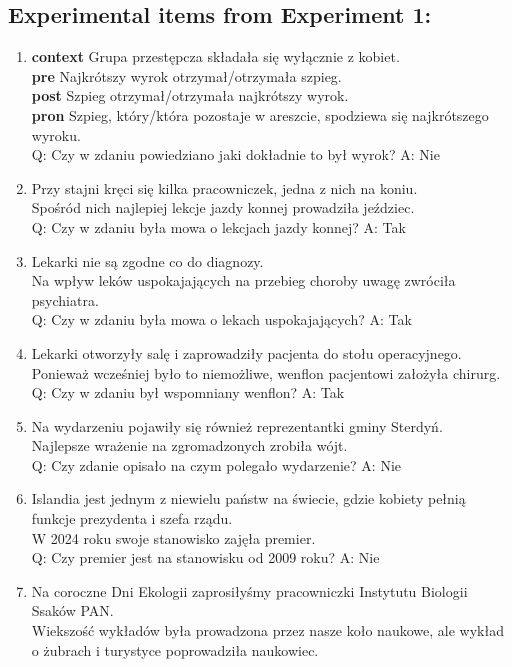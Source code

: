 \subsection*{Experimental items from Experiment 1:}
\begin{enumerate}
\item \textbf{context} Grupa przestępcza składała się wyłącznie z kobiet.\\
  \textbf{pre} Najkrótszy wyrok otrzymał/otrzymała szpieg.\\
  \textbf{post} Szpieg otrzymał/otrzymała najkrótszy wyrok.\\
  \textbf{pron} Szpieg, który/która pozostaje w areszcie, spodziewa się najkrótszego wyroku.\\
  Q: Czy w zdaniu powiedziano jaki dokładnie to był wyrok? A: Nie
\item Przy stajni kręci się kilka pracowniczek, jedna z nich na koniu.\\
	Spośród nich najlepiej lekcje jazdy konnej prowadziła jeździec.\\
	Q: Czy w zdaniu była mowa o lekcjach jazdy konnej? A: Tak
\item Lekarki nie są zgodne co do diagnozy.\\
	Na wpływ leków uspokajających na przebieg choroby uwagę zwróciła psychiatra.\\
	Q: Czy w zdaniu była mowa o lekach uspokajających? A: Tak
\item Lekarki otworzyły salę i zaprowadziły pacjenta do stołu operacyjnego.\\
	Ponieważ wcześniej było to niemożliwe, wenflon pacjentowi założyła chirurg.\\
	Q: Czy w zdaniu był wspomniany wenflon? A: Tak
\item Na wydarzeniu pojawiły się również reprezentantki gminy Sterdyń.\\
	Najlepsze wrażenie na zgromadzonych zrobiła wójt.\\
	Q: Czy zdanie opisało na czym polegało wydarzenie? A: Nie
\item Islandia jest jednym z niewielu państw na świecie, gdzie kobiety pełnią funkcje prezydenta i szefa rządu.\\
	W 2024 roku swoje stanowisko zajęła premier.\\
	Q: Czy premier jest na stanowisku od 2009 roku? A: Nie
\item Na coroczne Dni Ekologii zaprosiłyśmy pracowniczki Instytutu Biologii Ssaków PAN.\\
	Wiekszość wykładów była prowadzona przez nasze koło naukowe, ale wykład o żubrach i turystyce poprowadziła naukowiec.\\

\end{enumerate}
